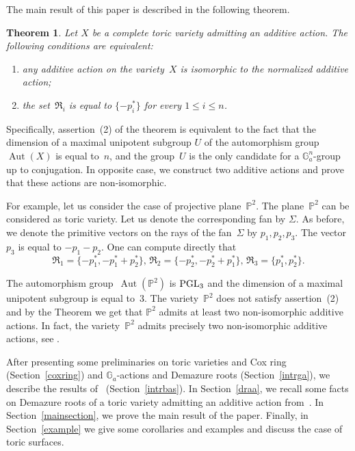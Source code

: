 \documentclass[a4paper,reqno,12pt]{amsart}
\DeclareMathOperator {\Aut}{Aut}
\def\Ga  {\mathbb G_a}
\def\P  {\mathbb P}
\newtheorem*{thm*}{Theorem}
\theoremstyle{definition}
\begin{document}
The main result of this paper is described in the following theorem.
\begin{thm*}
  Let $X$ be a complete toric variety admitting an additive action. The following conditions are equivalent:
  \begin{enumerate}
  \item any additive action on the variety~$X$ is isomorphic to the normalized additive action;
  \item the set~$\mathfrak R_i$ is equal to $\{-p_i^*\}$ for every $1 \leq i\leq n$.
  \end{enumerate}
\end{thm*}

Specifically, assertion~(2) of the theorem is equivalent to the fact that the dimension of a maximal unipotent subgroup $U$ of the automorphism group~$\Aut(X)$ is equal to~$n$, and the group~$U$ is the only candidate for a $\Ga^n$-group up to conjugation.
In opposite case, we construct two additive actions and prove that these actions are non-isomorphic.

For example, let us consider the case of projective plane~$\P^2$.
The plane~$\P^2$ can be considered as toric variety.
Let us denote the corresponding fan by $\Sigma$.
As before, we denote the primitive vectors on the rays of the fan~$\Sigma$ by $p_1, p_2, p_3$.
The vector $p_3$ is equal to $-p_1-p_2$.
One can compute directly that \[\mathfrak{R}_1=\{-p_1^*, -p_1^*+p_2^*\}, \,\mathfrak{R}_2=\{-p_2^*, -p_2^*+p_1^*\},\,\mathfrak{R}_3=\{p_1^*, p_2^*\}.\]

The automorphism group~$\Aut(\P^2)$ is ${\rm PGL}_3$ and the dimension of a maximal unipotent subgroup is equal to~$3$.
The variety~$\P^2$ does not satisfy assertion~(2) and by the Theorem we get that $\P^2$ admits at least two non-isomorphic additive actions.
In fact, the variety~$\P^2$ admits precisely two non-isomorphic additive actions, see \cite[Proposition~3.2]{HT}.

After presenting some preliminaries on toric varieties and Cox ring (Section~\ref{coxring}) and $\Ga$-actions and Demazure roots (Section~\ref{intrga}), we describe the results of~\cite{AR} (Section~\ref{intrbas}).
In Section~\ref{draa}, we recall some facts on Demazure roots of a toric variety admitting an additive action from~\cite{S}.
In Section~\ref{mainsection}, we prove the main result of the paper.
Finally, in Section~\ref{example} we give some corollaries and examples and discuss the case of toric surfaces.


\smallskip
\end{document}
